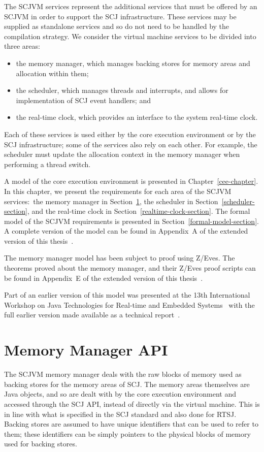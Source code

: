 The SCJVM services represent the additional services that must be
offered by an SCJVM in order to support the SCJ infrastructure.
These services may be supplied as standalone services and so do not
need to be handled by the compilation strategy.
We consider the virtual machine services to be divided into three
areas:
\begin{itemize}
\item the memory manager, which manages backing stores for memory areas and
  allocation within them;
\item the scheduler, which manages threads and interrupts, and allows for
  implementation of SCJ event handlers; and
\item the real-time clock, which provides an interface to the system real-time
  clock.
\end{itemize}
Each of these services is used either by the core execution environment or by
the SCJ infrastructure; some of the services also rely on each other.  For
example, the scheduler must update the allocation context in the memory manager
when performing a thread switch.

A model of the core execution environment is presented in
Chapter~\ref{cee-chapter}.
In this chapter, we present the requirements for each area of the
SCJVM services:~the memory manager in
Section~\ref{memory-manager-section}, the scheduler in
Section~\ref{scheduler-section}, and the real-time clock in
Section~\ref{realtime-clock-section}.
The formal model of the SCJVM requirements is presented in
Section~\ref{formal-model-section}.
A complete version of the model can be found in
Appendix~A of the extended version of this thesis~\cite{baxter2018-extended}.

The memory manager model has been subject to proof using Z/Eves.
The theorems proved about the memory manager, and their Z/Eves proof
scripts can be found in Appendix~E of the extended version of this
thesis~\cite{baxter2018-extended}.

Part of an earlier version of this model was presented at the 13th
International Workshop on Java Technologies for Real-time and Embedded
Systems~\cite{baxter2015a} with the full earlier version made available
as a technical report~\cite{baxter2015}.

\section{Memory Manager API}
\label{memory-manager-section}

The SCJVM memory manager deals with the raw blocks of memory used as
backing stores for the memory areas of SCJ.
The memory areas themselves are Java objects, and so are dealt with by
the core execution environment and accessed through the SCJ API,
instead of directly via the virtual machine.
This is in line with what is specified in the SCJ standard and also
done for RTSJ.
Backing stores are assumed to have unique identifiers that can be used
to refer to them; these identifiers can be simply pointers to the
physical blocks of memory used for backing stores.

